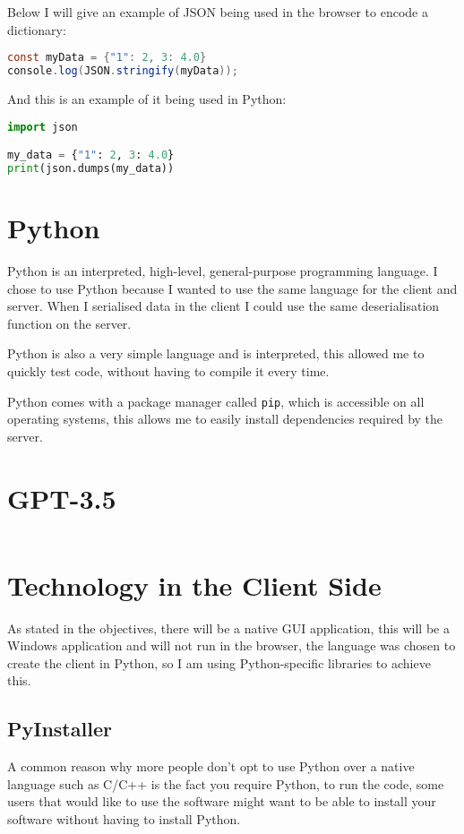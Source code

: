 Below I will give an example of JSON being used in the browser to encode a dictionary:

\begin{lstlisting}[language=Java]
const myData = {"1": 2, 3: 4.0}
console.log(JSON.stringify(myData));
\end{lstlisting}

And this is an example of it being used in Python:

\begin{lstlisting}[language=Python]
import json

my_data = {"1": 2, 3: 4.0}
print(json.dumps(my_data))
\end{lstlisting}

\section{Python}
Python is an interpreted, high-level, general-purpose programming language.
I chose to use Python because I wanted to use the same language for the client and server.
When I serialised data in the client I could use the same
deserialisation function on the server.

Python is also a very simple language and is interpreted,
this allowed me to quickly test code, without having to compile it every time.

Python comes with a package manager called \texttt{pip},
which is accessible on all operating systems,
this allows me to easily install dependencies required by the server.

\section{GPT-3.5}

\begin{lstlisting}[language=Python]
\end{lstlisting}

\section{Technology in the Client Side}
As stated in the objectives, there will be a native GUI application,
this will be a Windows application and will not run in the browser,
the language was chosen to create the client in Python,
so I am using Python-specific libraries to achieve this.

\subsection{PyInstaller}
A common reason why more people don't opt to use Python over a
native language such as C/C++ is the fact you require Python,
to run the code, some users that would like to use the software might 
want to be able to install your software without having to install Python.

